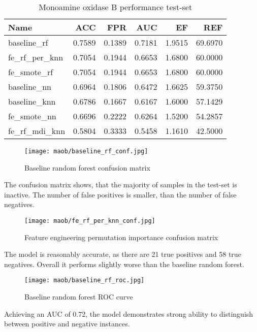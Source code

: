 \begin{table}[H]
    \begin{center}
        \caption{Monoamine oxidase B performance test-set}
        \begin{tabular}{lrrrrr}
            \toprule
            Name             & ACC    & FPR    & AUC    & EF     & REF     \\
            \midrule
            baseline\_rf     & 0.7589 & 0.1389 & 0.7181 & 1.9515 & 69.6970 \\
            fe\_rf\_per\_knn & 0.7054 & 0.1944 & 0.6653 & 1.6800 & 60.0000 \\
            fe\_smote\_rf    & 0.7054 & 0.1944 & 0.6653 & 1.6800 & 60.0000 \\
            baseline\_nn     & 0.6964 & 0.1806 & 0.6472 & 1.6625 & 59.3750 \\
            baseline\_knn    & 0.6786 & 0.1667 & 0.6167 & 1.6000 & 57.1429 \\
            fe\_smote\_nn    & 0.6696 & 0.2222 & 0.6264 & 1.5200 & 54.2857 \\
            fe\_rf\_mdi\_knn & 0.5804 & 0.3333 & 0.5458 & 1.1610 & 42.5000 \\
            \bottomrule
        \end{tabular}
    \end{center}
\end{table}

\begin{figure}[H]
    \begin{center}
        \caption[]{Baseline random forest confusion matrix}
        \label{fig:maob_baseline_rf_conf}
        \texttt{[image: maob/baseline\_rf\_conf.jpg]}
    \end{center}
\end{figure}
The confusion matrix shows, that the majority of samples in the test-set is inactive. The number of false positives is smaller, than the number of false negatives. 
\begin{figure}[H]
    \begin{center}
        \caption[]{Feature engineering permutation importance confusion matrix}
        \label{fig:maob_fe_rf_per_knn_conf}
        \texttt{[image: maob/fe\_rf\_per\_knn\_conf.jpg]}
    \end{center}

\end{figure}
The model is reasonably accurate, as there are 21 true positives and 58 true negatives. Overall it performs slightly worse than the baseline random forest.
\begin{figure}[H]
    \begin{center}
        \caption[]{Baseline random forest ROC curve}
        \label{fig:maob_baseline_rf_roc}
        \texttt{[image: maob/baseline\_rf\_roc.jpg]}
    \end{center}

\end{figure}
Achieving an AUC of 0.72, the model demonstrates strong ability to distinguish between positive and negative instances.

